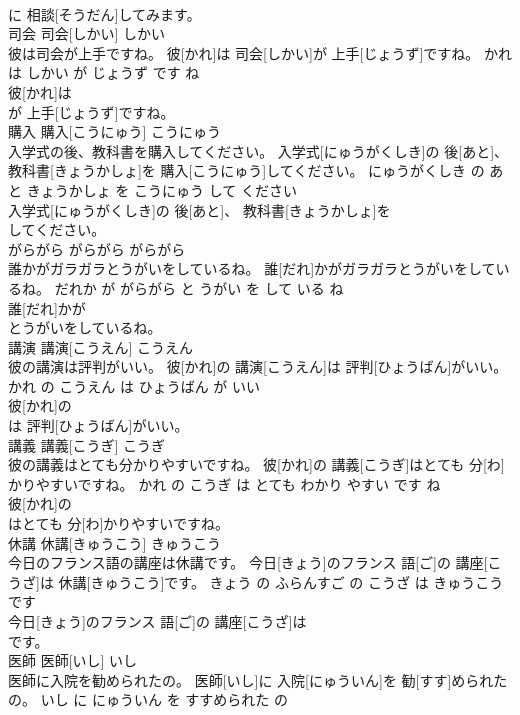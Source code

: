 \documentclass[8pt]{extreport}
\begin{document}
\begin{CJK}{UTF8}{min}
\\	に 相談[そうだん]してみます。			
\\	司会	司会[しかい]	しかい	
\\	彼は司会が上手ですね。	彼[かれ]は 司会[しかい]が 上手[じょうず]ですね。	かれ は しかい が じょうず です ね	
\\	彼[かれ]は
\\	が 上手[じょうず]ですね。			
\\	購入	購入[こうにゅう]	こうにゅう	
\\	入学式の後、教科書を購入してください。	入学式[にゅうがくしき]の 後[あと]、 教科書[きょうかしょ]を 購入[こうにゅう]してください。	にゅうがくしき の あと きょうかしょ を こうにゅう して ください	
\\	入学式[にゅうがくしき]の 後[あと]、 教科書[きょうかしょ]を
\\	してください。			
\\	がらがら	がらがら	がらがら	
\\	誰かがガラガラとうがいをしているね。	誰[だれ]かがガラガラとうがいをしているね。	だれか が がらがら と うがい を して いる ね	
\\	誰[だれ]かが
\\	とうがいをしているね。			
\\	講演	講演[こうえん]	こうえん	
\\	彼の講演は評判がいい。	彼[かれ]の 講演[こうえん]は 評判[ひょうばん]がいい。	かれ の こうえん は ひょうばん が いい	
\\	彼[かれ]の
\\	は 評判[ひょうばん]がいい。			
\\	講義	講義[こうぎ]	こうぎ	
\\	彼の講義はとても分かりやすいですね。	彼[かれ]の 講義[こうぎ]はとても 分[わ]かりやすいですね。	かれ の こうぎ は とても わかり やすい です ね	
\\	彼[かれ]の
\\	はとても 分[わ]かりやすいですね。			
\\	休講	休講[きゅうこう]	きゅうこう	
\\	今日のフランス語の講座は休講です。	今日[きょう]のフランス 語[ご]の 講座[こうざ]は 休講[きゅうこう]です。	きょう の ふらんすご の こうざ は きゅうこう です	
\\	今日[きょう]のフランス 語[ご]の 講座[こうざ]は
\\	です。			
\\	医師	医師[いし]	いし	
\\	医師に入院を勧められたの。	医師[いし]に 入院[にゅういん]を 勧[すす]められたの。	いし に にゅういん を すすめられた の	

\end{CJK}
\end{document}
